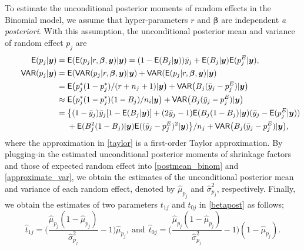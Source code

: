 \documentclass[article]{jss}
\begin{document}
To estimate the unconditional posterior moments of random effects in the Binomial model, we assume that hyper-parameters $r$  and  $\boldsymbol{\beta}$ are independent \emph{a posteriori}. With this assumption,  the unconditional posterior mean and variance of random effect $p_j$ are
\begin{align}
\mathsf{E}(p_{j}\vert \boldsymbol{y}) &=\mathsf{E}(\mathsf{E}(p_{j}\vert r, \boldsymbol{\beta}, \boldsymbol{y})\vert\boldsymbol{y})=(1-\mathsf{E}(B_j\vert\boldsymbol{y}))\bar{y}_j + \mathsf{E}(B_j\vert  \boldsymbol{y})\mathsf{E}(p^E_{j}\vert  \boldsymbol{y}),\label{postmean_binom} \\
~~~~~~\mathsf{VAR}(p_{j}\vert \boldsymbol{y}) &=  \mathsf{E}(\mathsf{VAR}(p_{j}\vert r, \boldsymbol{\beta}, \boldsymbol{y})\vert \boldsymbol{y})+\mathsf{VAR}(\mathsf{E}(p_{j}\vert r, \boldsymbol{\beta},\boldsymbol{y})\vert \boldsymbol{y})\label{postvar}\\
&= \mathsf{E}\big(p^{\ast}_{j}(1-p^{\ast}_{j})/ (r+n_{j}+1)\vert  \boldsymbol{y}\big)+\mathsf{VAR}\big(B_{j}(\bar{y}_{j}-p^E_{j})\vert \boldsymbol{y}\big) \\
&\approx \mathsf{E}\big(p^{\ast}_{j}(1-p^{\ast}_{j})(1-B_{j})/n_{i}\vert \boldsymbol{y}\big)+\mathsf{VAR}\big(B_{j}(\bar{y}_{j}-p^E_{j})\vert \boldsymbol{y}\big)\label{taylor}\\
&=\big\{(1-\bar{y}_j)\bar{y}_j[1-\mathsf{E}(B_j\vert \boldsymbol{y})]+(2\bar{y}_j-1)\mathsf{E}(B_j(1-B_j) \vert \boldsymbol{y})(\bar{y}_j-\mathsf{E}(p^E_j\vert\boldsymbol{y}))\nonumber\\
&~~~~+\mathsf{E}(B_j^2(1-B_j) \vert \boldsymbol{y})\mathsf{E}((\bar{y}_j-p^E_j)^2\vert\boldsymbol{y})\big\}/n_j+\mathsf{VAR}\big(B_{j}(\bar{y}_{j}-p^E_{j})\vert \boldsymbol{y}\big),\label{approximate_var}
\end{align}
where the approximation in \eqref{taylor} is a first-order Taylor approximation. By plugging-in the estimated unconditional posterior moments of shrinkage factors and those of expected random effect into   \eqref{postmean_binom} and \eqref{approximate_var}, we obtain the estimates of the unconditional posterior mean and variance of each random effect, denoted by $\hat{\mu}_{p_j}$ and $\hat{\sigma}^2_{p_j}$, respectively. Finally, we obtain the estimates of two parameters $t_{1j}$ and $t_{0j}$ in  \eqref{betapost} as follows;
\begin{equation}\label{posttrueprob}
\hat{t}_{1j}=\bigg(\frac{\hat{\mu}_{p_j}(1-\hat{\mu}_{p_j})}{\hat{\sigma}^2_{p_j}}-1\bigg)\hat{\mu}_{p_j},~\textrm{and}~~\hat{t}_{0j}=\bigg(\frac{\hat{\mu}_{p_j}(1-\hat{\mu}_{p_j})}{\hat{\sigma}^2_{p_j}}-1\bigg)(1-\hat{\mu}_{p_j}).
\end{equation}
\end{document}
